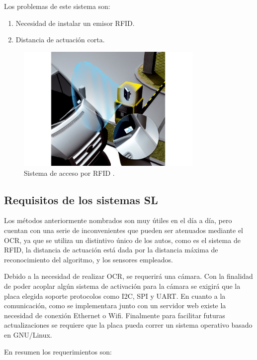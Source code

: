 Los problemas de este sistema son:

\begin{enumerate}
    \item Necesidad de instalar un emisor RFID.
    \item Distancia de actuación corta.
\end{enumerate}

\begin{figure}
    \centering
    \includegraphics[width=0.8\textwidth]{imgs/sistema-control-acceso-barreras-rfid.jpg}
    \caption{Sistema de acceso por RFID \cite{noauthor_acceso_nodate}.}
    \label{fig:sistema-moderno}
\end{figure}

\subsection{Requisitos de los sistemas SL}

Los métodos anteriormente nombrados son muy útiles en el día a día, pero cuentan con una serie de inconvenientes que pueden ser atenuados mediante el OCR, ya que se utiliza un distintivo único de los autos, como es el sistema de RFID, la distancia de actuación está dada por la distancia máxima de reconocimiento del algoritmo, y los sensores empleados.

Debido a la necesidad de realizar OCR, se requerirá una cámara. Con la finalidad de poder acoplar algún sistema de activación para la cámara se exigirá que la placa elegida soporte protocolos como I2C, SPI y UART. En cuanto a la comunicación, como se implementara junto con un servidor web existe la necesidad de conexión Ethernet o Wifi. Finalmente para facilitar futuras actualizaciones se requiere que la placa pueda correr un sistema operativo basado en GNU/Linux.

En resumen los requerimientos son:

